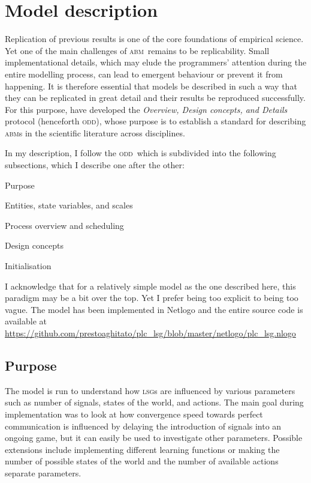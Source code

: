 \documentclass[
	DIV=calc,
	BCOR=0mm,
	pagesize,
]{scrartcl}
\newcommand{\abm}{\textsc{abm}}
\newcommand{\lsg}{\textsc{lsg}}
\newcommand{\odd}{\textsc{odd}}
\begin{document}
\section{Model description}
\label{sec:mod}
Replication of previous results is one of the core foundations of empirical science.
Yet one of the main challenges of \abm\ remains to be replicability.
Small implementational details, which may elude the programmers' attention during the entire modelling process, can lead to emergent behaviour or prevent it from happening.
It is therefore essential that models be described in such a way that they can be replicated in great detail and their results be reproduced successfully.
For this purpose, \citet{grimm_standard_2006, grimm_odd_2010} have developed the \emph{Overview, Design concepts, and Details} protocol (henceforth \odd), whose purpose is to establish a standard for describing \abm s in the scientific literature across disciplines.

In my description, I follow the \odd\, which is subdivided into the following subsections, which I describe one after the other:
\begin{enumerate*}
	\item Purpose
	\item Entities, state variables, and scales
	\item Process overview and scheduling
	\item Design concepts
	\item Initialisation
\end{enumerate*}
I acknowledge that for a relatively simple model as the one described here, this paradigm may be a bit over the top.
Yet I prefer being too explicit to being too vague.
The model has been implemented in Netlogo \citep{wilensky_netlogo_1999} and the entire source code is available at
\url{https://github.com/prestoaghitato/plc_lsg/blob/master/netlogo/plc_lsg.nlogo}

\subsection{Purpose}
\label{ssec:modpur}
The model is run to understand how \lsg s are influenced by various parameters such as number of signals, states of the world, and actions.
The main goal during implementation was to look at how convergence speed towards perfect communication is influenced by delaying the introduction of signals into an ongoing game, but it can easily be used to investigate other parameters.
Possible extensions include implementing different learning functions or making the number of possible states of the world and the number of available actions separate parameters.
\end{document}
